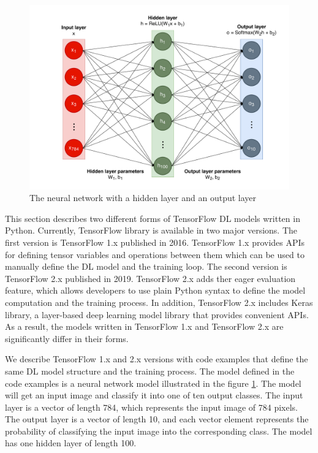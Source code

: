 \begin{figure}[ht!]
\includegraphics[width=\textwidth]{mnist_model.pdf}
  \caption{The neural network with a hidden layer and an output layer}
\label{fig:back:model}
\end{figure}

This section describes two different forms of TensorFlow DL models written in
Python.
Currently, TensorFlow library is available in two major versions.
The first version is TensorFlow 1.x published in 2016.
TensorFlow 1.x provides APIs for defining tensor variables and
operations between them which can be used to manually define the DL model
and the training loop.
The second version is TensorFlow 2.x published in 2019.
TensorFlow 2.x adds ther eager evaluation feature,
which allows developers to use plain Python syntax to define the model
computation and the training process.
In addition, TensorFlow 2.x includes Keras library, 
a layer-based deep learning model library that provides convenient APIs.
As a result, the models written in TensorFlow 1.x and TensorFlow 2.x are
significantly differ in their forms. 

We describe TensorFlow 1.x and 2.x versions with code examples that define
the same DL model structure and the training process.
The model defined in the code examples is a neural network model illustrated
in the figure \ref{fig:back:model}.
The model will get an input image and classify it into one of ten
output classes.
The input layer is a vector of length 784, which represents the input image
of 784 pixels.
The output layer is a vector of length 10, and each vector element represents 
the probability of classifying the input image into the corresponding class.
The model has one hidden layer of length 100. 



